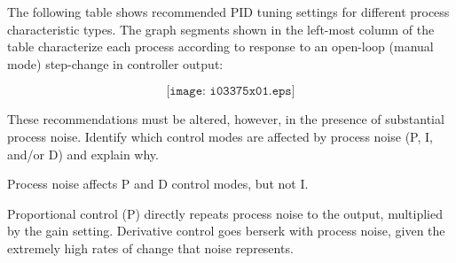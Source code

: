 

The following table shows recommended PID tuning settings for different process characteristic types.  The graph segments shown in the left-most column of the table characterize each process according to response to an open-loop (manual mode) step-change in controller output:

$$\texttt{[image: i03375x01.eps]}$$

These recommendations must be altered, however, in the presence of substantial process noise.  Identify which control modes are affected by process noise (P, I, and/or D) and explain why.







Process noise affects P and D control modes, but not I.
 






Proportional control (P) directly repeats process noise to the output, multiplied by the gain setting.  Derivative control goes berserk with process noise, given the extremely high rates of change that noise represents.




